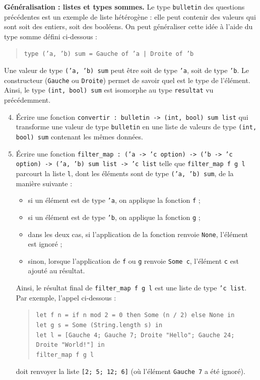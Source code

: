 \documentclass{article}
\begin{document}
{    \bigskip
    \textbf{Généralisation : listes et types sommes.} Le type \texttt{bulletin} des questions précédentes est un exemple de liste hétérogène : elle peut contenir des valeurs qui sont soit des entiers, soit des booléens. On peut généraliser cette idée à l'aide du type somme défini ci-dessous :
    \begin{quote}
    \texttt{type ('a, 'b) sum = Gauche of 'a | Droite of 'b}
    \end{quote}
    Une valeur de type \texttt{('a, 'b) sum} peut être soit de type \texttt{'a}, soit de type \texttt{'b}. Le constructeur (\texttt{Gauche} ou \texttt{Droite}) permet de savoir quel est le type de l'élément. Ainsi, le type \texttt{(int, bool) sum} est isomorphe au type \texttt{resultat} vu précédemment.

    \begin{enumerate}
        \setcounter{enumi}{3}
        \item Écrire une fonction \texttt{convertir : bulletin -> (int, bool) sum list} qui transforme une valeur de type \texttt{bulletin} en une liste de valeurs de type \texttt{(int, bool) sum} contenant les mêmes données.

        \item Écrire une fonction \texttt{filter\_map : ('a -> 'c option) -> ('b -> 'c option) -> ('a, 'b) sum list -> 'c list} telle que \texttt{filter\_map f g l} parcourt la liste \texttt{l}, dont les éléments sont de type \texttt{('a, 'b) sum}, de la manière suivante :
        \begin{itemize}
            \item si un élément est de type \texttt{'a}, on applique la fonction \texttt{f} ;
            \item si un élément est de type \texttt{'b}, on applique la fonction \texttt{g} ;
            \item dans les deux cas, si l'application de la fonction renvoie \texttt{None}, l'élément est ignoré ;
            \item sinon, lorsque l'application de \texttt{f} ou \texttt{g} renvoie \texttt{Some c}, l'élément \texttt{c} est ajouté au résultat.
        \end{itemize}
        Ainsi, le résultat final de \texttt{filter\_map f g l} est une liste de type \texttt{'c list}.\\
        Par exemple, l'appel ci-dessous :
        \begin{quote}
        \texttt{let f n = if n mod 2 = 0 then Some (n / 2) else None in}\\
        \texttt{let g s = Some (String.length s) in}\\
        \texttt{let l = [Gauche 4; Gauche 7; Droite "Hello"; Gauche 24; Droite "World!"] in}\\
        \texttt{filter\_map f g l}
        \end{quote}
        doit renvoyer la liste \texttt{[2; 5; 12; 6]} (où l'élément \texttt{Gauche 7} a été ignoré).


\end{enumerate}}
\end{document}
